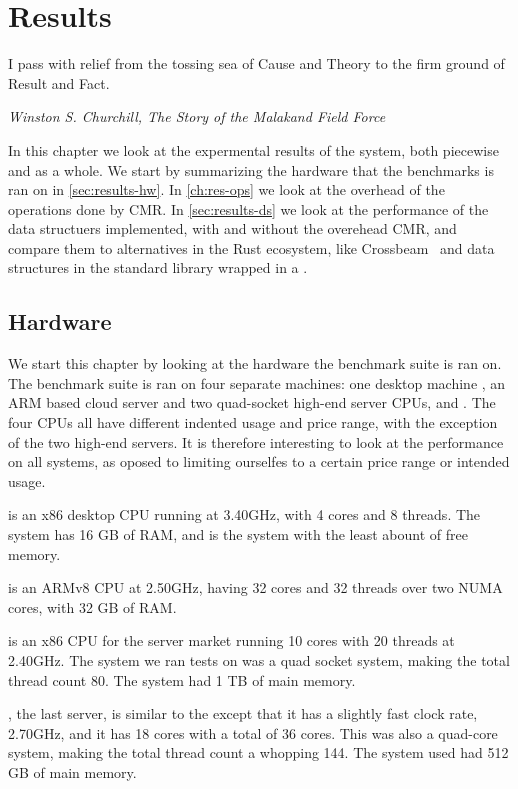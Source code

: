 \chapter{Results\label{ch:results}}

\epigraph{I pass with relief from the tossing sea of Cause and Theory to the firm ground of Result
and Fact.} {\textit{Winston S. Churchill, The Story of the Malakand Field Force}}

In this chapter we look at the expermental results of the system, both piecewise and as a whole.
We start by summarizing the hardware that the benchmarks is ran on in \cref{sec:results-hw}. In
\cref{ch:res-ops} we look at the overhead of the operations done by CMR\@. In \cref{sec:results-ds} we
look at the performance of the data structuers implemented, with and without the overehead CMR, and
compare them to alternatives in the Rust ecosystem, like Crossbeam~\cite{crossbeam} and data
structures in the standard library wrapped in a .

\clearpage

\section{Hardware\label{sec:results-hw}}

We start this chapter by looking at the hardware the benchmark suite is ran on.  The benchmark
suite is ran on four separate machines: one desktop machine \gribb{}, an ARM based cloud server
\scaleway{} and two quad-socket high-end server CPUs, \mitserver{} and \daslab{}.  The four CPUs
all have different indented usage and price range, with the exception of the two high-end servers.
It is therefore interesting to look at the performance on all systems, as oposed to limiting
ourselfes to a certain price range or intended usage.

\gribb{} is an x86 desktop CPU running at 3.40GHz, with 4 cores and 8 threads. The system has 16 GB of
RAM, and is the system with the least abount of free memory.

\scaleway{} is an ARMv8 CPU at 2.50GHz, having 32 cores and 32 threads over two NUMA cores, with 32
GB of RAM\@.

\mitserver{} is an x86 CPU for the server market running 10 cores with 20 threads at 2.40GHz. The
system we ran tests on was a quad socket system, making the total thread count 80. The system had 1
TB of main memory.

\daslab{}, the last server, is similar to the \mitserver{} except that it has a slightly fast clock
rate, 2.70GHz, and it has 18 cores with a total of 36 cores. This was also a quad-core system,
making the total thread count a whopping 144. The system used had 512 GB of main memory.


